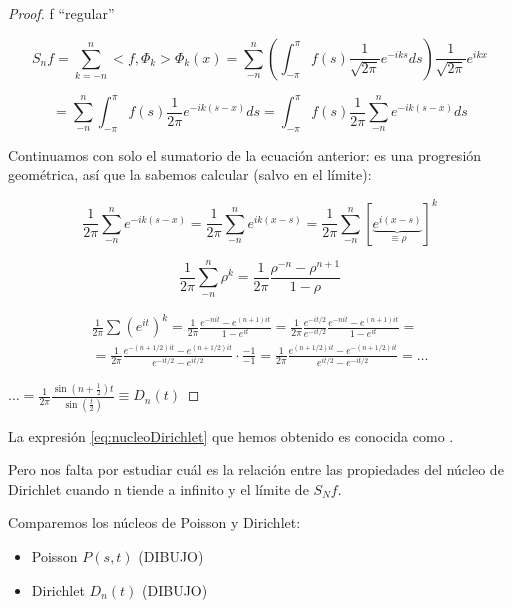 	\begin{proof}

		f ``regular''

		\[S_nf = \sum_{k=-n}^{n} <f,\Phi_k> \Phi_k(x) = \sum_{-n}^n \left( \int_{-\pi}^\pi f(s) \frac{1}{\sqrt{2\pi}} e^{-iks} ds \right)  \frac{1}{\sqrt{2\pi}} e^{ikx} \]

		\[ = \sum_{-n}^{n}  \int_{-\pi}^\pi f(s) \frac{1}{2\pi} e^{-ik(s-x)} ds = \int_{-\pi}^{\pi} f(s) \frac{1}{2\pi} \sum_{-n}^n e^{-ik(s-x)} ds \]

		Continuamos con solo el sumatorio de la ecuación anterior: es una progresión geométrica, así que la sabemos calcular (salvo en el límite):

		\[ \frac{1}{2\pi} \sum_{-n}^n e^{-ik(s-x)} = \frac{1}{2\pi} \sum_{-n}^n e^{ik(x-s)} = \frac{1}{2\pi} \sum_{-n}^n \left[\underbrace{e^{i(x-s)} }_{\equiv \rho}\right]^k \]

		\[ \frac{1}{2\pi} \sum_{-n}^n \rho^k = \frac{1}{2\pi} \frac{\rho^{-n} - \rho^{n+1}}{1 -\rho} \]

		\begin{gather*}
		\frac{1}{2\pi}  \sum(e^{it})^k = \frac{1}{2\pi} \frac{e^{-nit}-e^{(n+1)it}}{1-e^{it}} = \frac{1}{2\pi} \frac{e^{-it/2}}{e^{-it/2}} \frac{ e^{-nit}-e^{(n+1)it}}{1-e^{it}} =\\
		= \frac{1}{2\pi} \frac{e^{-(n + 1/2)it}-e^{(n+1/2)it} }{e^{-it/2}-e^{it/2}} \cdot \frac{-1}{-1} = \frac{1}{2\pi} \frac{e^{(n + 1/2)it} - e^{-(n+1/2)it} }{e^{it/2}-e^{-it/2}} = \dots
		\end{gather*}

		\( … = \frac{1}{2\pi} \frac{\sin(n+ \frac{1}{2})t}{\sin(\frac{t}{2})}  \equiv D_n(t) \label{eq:nucleoDirichlet}\)
	\end{proof}

		La expresión \ref{eq:nucleoDirichlet} que hemos obtenido es conocida como .

		Pero nos falta por estudiar cuál es la relación entre las propiedades del núcleo de Dirichlet cuando n tiende a infinito y el límite de $S_N f$.




	Comparemos los núcleos de Poisson y Dirichlet:

	\begin{itemize}

		\item Poisson $P(s,t)$ (DIBUJO)

		\item Dirichlet $D_n(t)$ (DIBUJO)

	\end{itemize}

